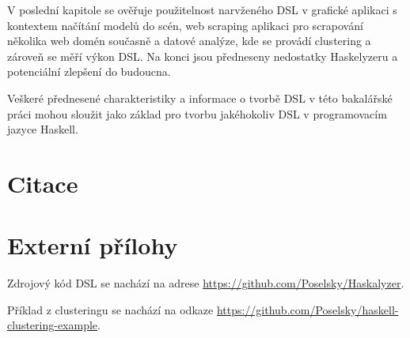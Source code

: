 \documentclass[male,czech]{kithesis}
\begin{document}
V poslední kapitole se ověřuje použitelnost narvženého DSL v 
grafické aplikaci s kontextem načítání modelů do scén,
web scraping aplikaci pro scrapování několika web domén současně a 
datové analýze, 
kde se provádí clustering a zároveň se měří výkon DSL.
Na konci jsou předneseny nedostatky Haskelyzeru a 
potenciální zlepšení do budoucna.

Veškeré přednesené charakteristiky a 
informace o tvorbě DSL v této bakalářské práci
mohou sloužit jako základ pro tvorbu jakéhokoliv DSL v programovacím jazyce Haskell.

\chapter{Citace}


\printbibliography[heading=none]
\appendix


\chapter{Externí přílohy}

Zdrojový kód DSL se nachází na adrese \href{https://github.com/Poselsky/Haskalyzer}{https://github.com/Poselsky/Haskalyzer}.

Příklad z clusteringu se nachází na odkaze \href{https://github.com/Poselsky/haskell-clustering-example}{https://github.com/Poselsky/haskell-clustering-example}.
\end{document}
